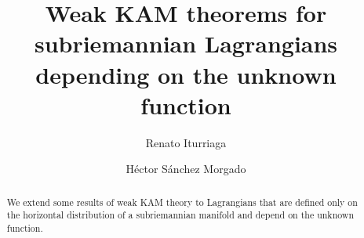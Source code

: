 \documentclass[12pt]{amsart}
\theoremstyle{plain}
\theoremstyle{definition}
\begin{document}
\title [subriemannian Lagrangians depending on the unknown]
{Weak KAM theorems  for subriemannian Lagrangians
depending on the unknown function}
\author [R.  Iturriaga,]{Renato Iturriaga}
\address{Cimat, Valenciana Guanajuato 36000, M\'exico}
\author [H. S\'anchez Morgado]{ H\'ector S\'anchez Morgado}
\address{Instituto de Matem\'aticas, UNAM. Ciudad Universitaria C. P. 04510, Cd. de M\'exico, M\'exico.}
\begin{abstract}
We extend some results of weak KAM theory to Lagrangians that are defined
  only on the horizontal distribution of a subriemannian
  manifold and depend on the unknown function.
  \end{abstract}
\maketitle
\end{document}

